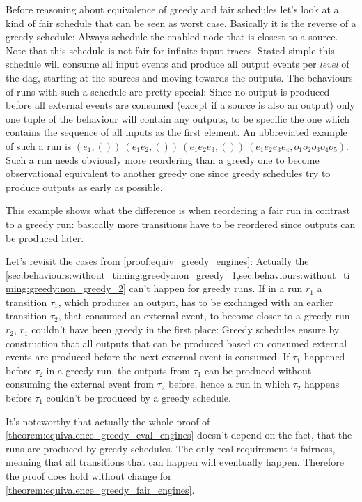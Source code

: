   Before reasoning about equivalence of greedy and fair schedules let's look at a kind of fair schedule that can be seen as worst case.
  Basically it is the reverse of a greedy schedule: Always schedule the enabled node that is closest to a source.
  Note that this schedule is not fair for infinite input traces.
  Stated simple this schedule will consume all input events and produce all output events per \emph{level} of the \gls{dag}, starting at the sources and moving towards the outputs.
  The behaviours of runs with such a schedule are pretty special: Since no output is produced before all external events are consumed (except if a source is also an output) only one tuple of the behaviour will contain any outputs, to be specific the one which contains the sequence of all inputs as the first element.
  An abbreviated example of such a run is \((e_1,())\ (e_1e_2,())\ (e_1e_2e_3,())\ (e_1e_2e_3e_4,o_1o_2o_3o_4o_5)\).
  Such a run needs obviously more reordering than a greedy one to become observational equivalent to another greedy one since greedy schedules try to produce outputs as early as possible.

  This example shows what the difference is when reordering a fair run in contrast to a greedy run: basically more transitions have to be reordered since outputs can be produced later.

  Let's revisit the cases from \cref{proof:equiv_greedy_engines}:
  Actually the \cref{sec:behaviours:without_timing:greedy:non_greedy_1,sec:behaviours:without_timing:greedy:non_greedy_2} can't happen for greedy runs.
  If in a run \(r_1\) a transition \(\tau_1\), which produces an output, has to be exchanged with an earlier transition \(\tau_2\), that consumed an external event, to become closer to a greedy run \(r_2\), \(r_1\) couldn't have been greedy in the first place:
  Greedy schedules ensure by construction that all outputs that can be produced based on consumed external events are produced before the next external event is consumed.
  If \(\tau_1\) happened before \(\tau_2\) in a greedy run, the outputs from \(\tau_1\) can be produced without consuming the external event from \(\tau_2\) before, hence a run in which \(\tau_2\) happens before \(\tau_1\) couldn't be produced by a greedy schedule.

  It's noteworthy that actually the whole proof of \cref{theorem:equivalence_greedy_eval_engines} doesn't depend on the fact, that the runs are produced by greedy schedules.
  The only real requirement is fairness, meaning that all transitions that can happen will eventually happen.
  Therefore the proof does hold without change for \cref{theorem:equivalence_greedy_fair_engines}.

